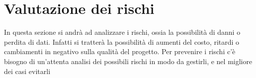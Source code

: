 \chapter{Valutazione dei rischi} 

In questa sezione si andrà ad analizzare i rischi, ossia la possibilità di danni o perdita di dati. Infatti si tratterà la possibilità di aumenti del costo, ritardi o cambiamenti in negativo sulla qualità del progetto. Per prevenire i rischi c’è bisogno di un’attenta analisi dei possibili rischi in modo da gestirli, e nel migliore dei casi evitarli